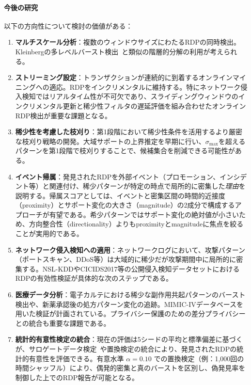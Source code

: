 \paragraph{今後の研究}
以下の方向性について検討の価値がある：
\begin{enumerate}
\item \textbf{マルチスケール分析}：複数のウィンドウサイズにわたるRDPの同時検出。Kleinbergの多レベルバースト検出~\cite{kleinberg2003bursty}と類似の階層的分解の利用が考えられる。

\item \textbf{ストリーミング設定}：トランザクションが連続的に到着するオンラインマイニングへの適応。RDPをインクリメンタルに維持する。特にネットワーク侵入検知ではリアルタイム性が不可欠であり、スライディングウィンドウのインクリメンタル更新と稀少性フィルタの遅延評価を組み合わせたオンラインRDP検出が重要な課題となる。

\item \textbf{稀少性を考慮した枝刈り}：第1段階において稀少性条件を活用するより厳密な枝刈り戦略の開発。大域サポートの上界推定を早期に行い、$\sigma_{\max}$を超えるパターンを第1段階で枝刈りすることで、候補集合を削減できる可能性がある。

\item \textbf{イベント帰属}：発見されたRDPを外部イベント（プロモーション、インシデント等）と関連付け、稀少パターンが特定の時点で局所的に密集した\emph{理由}を説明する。帰属スコアとしては、イベントと密集区間の時間的近接度（proximity）とサポート変化の大きさ（magnitude）の2成分で構成するアプローチが有望である。希少パターンではサポート変化の絶対値が小さいため、方向整合性（directionality）よりもproximityとmagnitudeに焦点を絞ることが実用的である。

\item \textbf{ネットワーク侵入検知への適用}：ネットワークログにおいて、攻撃パターン（ポートスキャン、DDoS等）は大域的に稀少だが攻撃期間中に局所的に密集する。NSL-KDDやCICIDS2017等の公開侵入検知データセットにおけるRDPの有効性検証が具体的な次のステップである。

\item \textbf{医療データ分析}：電子カルテにおける稀少な副作用共起パターンのバースト検出や、新薬承認後の処方パターン変化の追跡。MIMIC-IVデータベースを用いた検証が計画されている。プライバシー保護のための差分プライバシーとの統合も重要な課題である。

\item \textbf{統計的有意性検定の統合}：現在の評価は5シードの平均と標準偏差に基づくが、サロゲートデータ検定~\cite{lancaster2018surrogate}や置換検定の統合により、発見されたRDPの統計的有意性を評価できる。有意水準 $\alpha = 0.10$ での置換検定（例：1{,}000回の時間シャッフル）により、偶発的密集と真のバーストを区別し、偽発見率を制御した上でのRDP報告が可能となる。
\end{enumerate}
